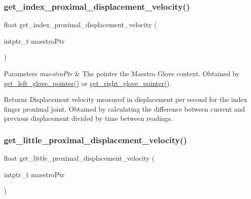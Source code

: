 \subsubsection{\texorpdfstring{get\+\_\+index\+\_\+proximal\+\_\+displacement\+\_\+velocity()}{get\_index\_proximal\_displacement\_velocity()}}
{\footnotesize\ttfamily float get\+\_\+index\+\_\+proximal\+\_\+displacement\+\_\+velocity (\begin{DoxyParamCaption}\item[{intptr\+\_\+t}]{maestro\+Ptr }\end{DoxyParamCaption})}


\begin{DoxyParams}{Parameters}
{\em maestro\+Ptr} & The pointer the Maestro Glove context. Obtained by \hyperlink{group__glove_management_ga63ce3c99d4a8b8db851b22af9185764e}{get\+\_\+left\+\_\+glove\+\_\+pointer()} or \hyperlink{group__glove_management_ga9b8fd9d91aeac3f8da50f7a7eba0c32b}{get\+\_\+right\+\_\+glove\+\_\+pointer()}. \\
\hline
\end{DoxyParams}
\begin{DoxyReturn}{Returns}
Displacement velocity measured in displacement per second for the index finger proximal joint. Obtained by calculating the difference between current and previous displacement divided by time between readings. 
\end{DoxyReturn}
\mbox{\label{group__velocity_access_ga1c0fe44ea6caec9d337030a4395759ea}} 
\subsubsection{\texorpdfstring{get\+\_\+little\+\_\+proximal\+\_\+displacement\+\_\+velocity()}{get\_little\_proximal\_displacement\_velocity()}}
{\footnotesize\ttfamily float get\+\_\+little\+\_\+proximal\+\_\+displacement\+\_\+velocity (\begin{DoxyParamCaption}\item[{intptr\+\_\+t}]{maestro\+Ptr }\end{DoxyParamCaption})}


